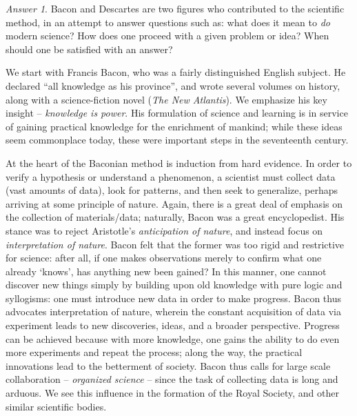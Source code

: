 \documentclass[11pt]{article}
\theoremstyle{remark}
\newtheorem*{answer}{Answer}
\begin{document}
    \begin{answer}
        Bacon and Descartes are two figures who contributed to the scientific method,
        in an attempt to answer questions such as: what does it mean to \emph{do}
        modern science? How does one proceed with a given problem or idea? When
        should one be satisfied with an answer?

        We start with Francis Bacon, who was a fairly distinguished English subject.
        He declared ``all knowledge as his province'', and wrote several volumes on
        history, along with a science-fiction novel (\emph{The New Atlantis}). We
        emphasize his key insight -- \emph{knowledge is power}. His formulation of
        science and learning is in service of gaining practical knowledge for the
        enrichment of mankind; while these ideas seem commonplace today, these
        were important steps in the seventeenth century.

        At the heart of the Baconian method is induction from hard evidence. In order
        to verify a hypothesis or understand a phenomenon, a scientist must collect
        data (vast amounts of data), look for patterns, and then seek to generalize,
        perhaps arriving at some principle of nature. Again, there is a great deal of
        emphasis on the collection of materials/data; naturally, Bacon was a great
        encyclopedist. His stance was to reject Aristotle's \emph{anticipation of
        nature}, and instead focus on \emph{interpretation of nature}. Bacon felt
        that the former was too rigid and restrictive for science: after all, if one
        makes observations merely to confirm what one already `knows', has anything
        new been gained? In this manner, one cannot discover new things simply by
        building upon old knowledge with pure logic and syllogisms: one must
        introduce new data in order to make progress. Bacon thus advocates
        interpretation of nature, wherein the constant acquisition of data via
        experiment leads to new discoveries, ideas, and a broader perspective.
        Progress can be achieved because with more knowledge, one gains the ability
        to do even more experiments and repeat the process; along the way, the
        practical innovations lead to the betterment of society. Bacon thus calls for
        large scale collaboration -- \emph{organized science} -- since the task of
        collecting data is long and arduous. We see this influence in the formation
        of the Royal Society, and other similar scientific bodies.


\end{answer}
\end{document}
